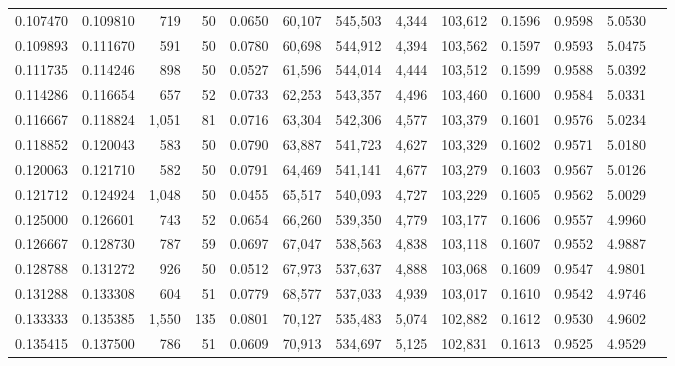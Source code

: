 \begin{tabular}{rrrrrrrrrrrrr}
0.107470 & 0.109810 &    719 &    50 &                                     0.0650 &  60,107 & 545,503 &   4,344 & 103,612 & 0.1596 & 0.9598 & 5.0530 \\
0.109893 & 0.111670 &    591 &    50 &                                     0.0780 &  60,698 & 544,912 &   4,394 & 103,562 & 0.1597 & 0.9593 & 5.0475 \\
0.111735 & 0.114246 &    898 &    50 &                                     0.0527 &  61,596 & 544,014 &   4,444 & 103,512 & 0.1599 & 0.9588 & 5.0392 \\
0.114286 & 0.116654 &    657 &    52 &                                     0.0733 &  62,253 & 543,357 &   4,496 & 103,460 & 0.1600 & 0.9584 & 5.0331 \\
0.116667 & 0.118824 &  1,051 &    81 &                                     0.0716 &  63,304 & 542,306 &   4,577 & 103,379 & 0.1601 & 0.9576 & 5.0234 \\
0.118852 & 0.120043 &    583 &    50 &                                     0.0790 &  63,887 & 541,723 &   4,627 & 103,329 & 0.1602 & 0.9571 & 5.0180 \\
0.120063 & 0.121710 &    582 &    50 &                                     0.0791 &  64,469 & 541,141 &   4,677 & 103,279 & 0.1603 & 0.9567 & 5.0126 \\
0.121712 & 0.124924 &  1,048 &    50 &                                     0.0455 &  65,517 & 540,093 &   4,727 & 103,229 & 0.1605 & 0.9562 & 5.0029 \\
0.125000 & 0.126601 &    743 &    52 &                                     0.0654 &  66,260 & 539,350 &   4,779 & 103,177 & 0.1606 & 0.9557 & 4.9960 \\
0.126667 & 0.128730 &    787 &    59 &                                     0.0697 &  67,047 & 538,563 &   4,838 & 103,118 & 0.1607 & 0.9552 & 4.9887 \\
0.128788 & 0.131272 &    926 &    50 &                                     0.0512 &  67,973 & 537,637 &   4,888 & 103,068 & 0.1609 & 0.9547 & 4.9801 \\
0.131288 & 0.133308 &    604 &    51 &                                     0.0779 &  68,577 & 537,033 &   4,939 & 103,017 & 0.1610 & 0.9542 & 4.9746 \\
0.133333 & 0.135385 &  1,550 &   135 &                                     0.0801 &  70,127 & 535,483 &   5,074 & 102,882 & 0.1612 & 0.9530 & 4.9602 \\
0.135415 & 0.137500 &    786 &    51 &                                     0.0609 &  70,913 & 534,697 &   5,125 & 102,831 & 0.1613 & 0.9525 & 4.9529 \\

\end{tabular}
